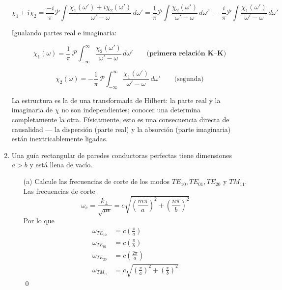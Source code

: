 \documentclass[]{article}
\numberwithin{equation}{section}
\begin{document}
\begin{enumerate}
	$$\chi_1 + i\chi_2 = \frac{-i}{\pi}\mathcal{P}\!\int\frac{\chi_1(\omega') + i\chi_2(\omega')}{\omega'-\omega}\,d\omega' = \frac{1}{\pi}\mathcal{P}\!\int\frac{\chi_2(\omega')}{\omega'-\omega}\,d\omega' \;-\; \frac{i}{\pi}\mathcal{P}\!\int\frac{\chi_1(\omega')}{\omega'-\omega}\,d\omega'$$
	
	Igualando partes real e imaginaria:
	
	$$\boxed{\chi_1(\omega) = \frac{1}{\pi}\,\mathcal{P}\!\int_{-\infty}^{\infty} \frac{\chi_2(\omega')}{\omega'-\omega}\,d\omega'} \qquad \textbf{(primera relación K–K)}$$
	
	$$\chi_2(\omega) = -\frac{1}{\pi}\,\mathcal{P}\!\int_{-\infty}^{\infty} \frac{\chi_1(\omega')}{\omega'-\omega}\,d\omega' \qquad \text{(segunda)}$$
	
	La estructura es la de una transformada de Hilbert: la parte real y la imaginaria de $\chi$ no son independientes; conocer una determina completamente la otra. Físicamente, esto es una consecuencia directa de causalidad — la dispersión (parte real) y la absorción (parte imaginaria) están inextricablemente ligadas.
	
	\item Una guía rectangular de paredes conductoras perfectas tiene dimensiones $a > b$ y está llena de vacío.
	\begin{enumerate}
		\item[(a)] Calcule las frecuencias de corte de los modos ${T\!E}_{10}, {T\!E}_{01}, {T\!E}_{20}$ y ${T\!M}_{11}$.
		\resp Las frecuencias de corte
		\begin{equation}
			\omega_c = \frac{k_\perp}{\sqrt{\mu\epsilon}} = c \sqrt{\left(\frac{m\pi}{a}\right)^2 + \left(\frac{n\pi}{b}\right)^2 }
		\end{equation}
		Por lo que
		\begin{align*}
			\omega_{{T\!E}_{10}} &= c \left(\frac{\pi}{a}\right)\\
			\omega_{{T\!E}_{01}} &= c \left(\frac{\pi}{b}\right)\\
			\omega_{{T\!E}_{20}} &= c \left(\frac{2\pi}{a}\right)\\
			\omega_{{T\!M}_{11}} &= c \sqrt{\left(\frac{\pi}{a}\right)^2 + \left(\frac{\pi}{b}\right)^2 }
		\end{align*}
		\qed
		

\end{enumerate}
\end{enumerate}
\end{document}
